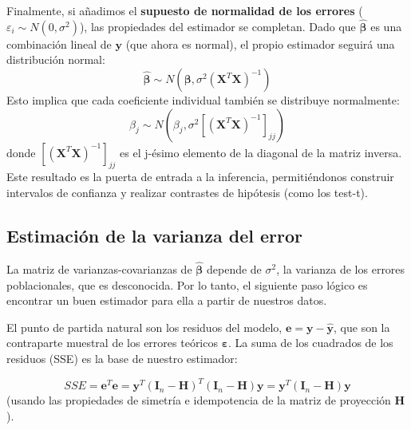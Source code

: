 \documentclass[
  letterpaper,
  DIV=11,
  numbers=noendperiod]{scrreprt}
\begin{document}
Finalmente, si añadimos el \textbf{supuesto de normalidad de los
errores} (\(\varepsilon_i \sim N(0, \sigma^2)\)), las propiedades del
estimador se completan. Dado que \(\hat{\boldsymbol{\beta}}\) es una
combinación lineal de \(\mathbf{y}\) (que ahora es normal), el propio
estimador seguirá una distribución normal:
\[\hat{\boldsymbol{\beta}} \sim N\left(\boldsymbol{\beta}, \sigma^2(\mathbf{X}^T\mathbf{X})^{-1}\right)\]Esto
implica que cada coeficiente individual también se distribuye
normalmente:\[\hat{\beta}_j \sim N\left(\beta_j, \sigma^2 [(\mathbf{X}^T\mathbf{X})^{-1}]_{jj}\right)\]
donde \([(\mathbf{X}^T\mathbf{X})^{-1}]_{jj}\) es el j-ésimo elemento de
la diagonal de la matriz inversa. Este resultado es la puerta de entrada
a la inferencia, permitiéndonos construir intervalos de confianza y
realizar contrastes de hipótesis (como los test-t).

\subsection{Estimación de la varianza del
error}\label{estimaciuxf3n-de-la-varianza-del-error-1}

La matriz de varianzas-covarianzas de \(\hat{\boldsymbol{\beta}}\)
depende de \(\sigma^2\), la varianza de los errores poblacionales, que
es desconocida. Por lo tanto, el siguiente paso lógico es encontrar un
buen estimador para ella a partir de nuestros datos.

El punto de partida natural son los residuos del modelo,
\(\mathbf{e} = \mathbf{y} - \hat{\mathbf{y}}\), que son la contraparte
muestral de los errores teóricos \(\boldsymbol{\varepsilon}\). La suma
de los cuadrados de los residuos (SSE) es la base de nuestro estimador:

\[SSE = \mathbf{e}^T\mathbf{e} = \mathbf{y}^T(\mathbf{I}_n - \mathbf{H})^T(\mathbf{I}_n - \mathbf{H})\mathbf{y} = \mathbf{y}^T(\mathbf{I}_n - \mathbf{H})\mathbf{y}\]
(usando las propiedades de simetría e idempotencia de la matriz de
proyección \(\mathbf{H}\)).
\end{document}
